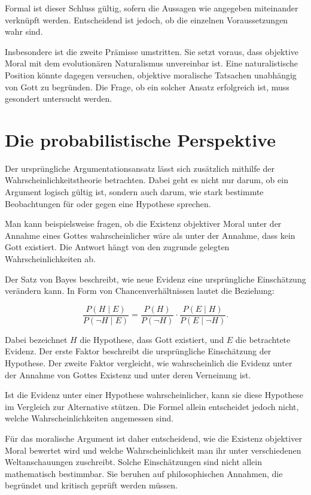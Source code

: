 \documentclass[11pt,a4paper]{article}
\begin{document}
	Formal ist dieser Schluss gültig, sofern die Aussagen wie angegeben miteinander verknüpft werden. Entscheidend ist jedoch, ob die einzelnen Voraussetzungen wahr sind.
	
	Insbesondere ist die zweite Prämisse umstritten. Sie setzt voraus, dass objektive Moral mit dem evolutionären Naturalismus unvereinbar ist. Eine naturalistische Position könnte dagegen versuchen, objektive moralische Tatsachen unabhängig von Gott zu begründen. Die Frage, ob ein solcher Ansatz erfolgreich ist, muss gesondert untersucht werden.
	
	\section{Die probabilistische Perspektive}
	
	Der ursprüngliche Argumentationsansatz lässt sich zusätzlich mithilfe der Wahrscheinlichkeitstheorie betrachten. Dabei geht es nicht nur darum, ob ein Argument logisch gültig ist, sondern auch darum, wie stark bestimmte Beobachtungen für oder gegen eine Hypothese sprechen.
	
	Man kann beispielsweise fragen, ob die Existenz objektiver Moral unter der Annahme eines Gottes wahrscheinlicher wäre als unter der Annahme, dass kein Gott existiert. Die Antwort hängt von den zugrunde gelegten Wahrscheinlichkeiten ab.
	
	\begin{tcolorbox}[title=Mathematische Erläuterung: Bayes'sche Wahrscheinlichkeiten]
		Der Satz von Bayes beschreibt, wie neue Evidenz eine ursprüngliche Einschätzung verändern kann. In Form von Chancenverhältnissen lautet die Beziehung:
		
		\[
		\frac{P(H\mid E)}{P(\neg H\mid E)}
		=
		\frac{P(H)}{P(\neg H)}
		\cdot
		\frac{P(E\mid H)}{P(E\mid\neg H)}.
		\]
		
		Dabei bezeichnet \(H\) die Hypothese, dass Gott existiert, und \(E\) die betrachtete Evidenz. Der erste Faktor beschreibt die ursprüngliche Einschätzung der Hypothese. Der zweite Faktor vergleicht, wie wahrscheinlich die Evidenz unter der Annahme von Gottes Existenz und unter deren Verneinung ist.
		
		Ist die Evidenz unter einer Hypothese wahrscheinlicher, kann sie diese Hypothese im Vergleich zur Alternative stützen. Die Formel allein entscheidet jedoch nicht, welche Wahrscheinlichkeiten angemessen sind.
	\end{tcolorbox}
	
	Für das moralische Argument ist daher entscheidend, wie die Existenz objektiver Moral bewertet wird und welche Wahrscheinlichkeit man ihr unter verschiedenen Weltanschauungen zuschreibt. Solche Einschätzungen sind nicht allein mathematisch bestimmbar. Sie beruhen auf philosophischen Annahmen, die begründet und kritisch geprüft werden müssen.
	
\end{document}
